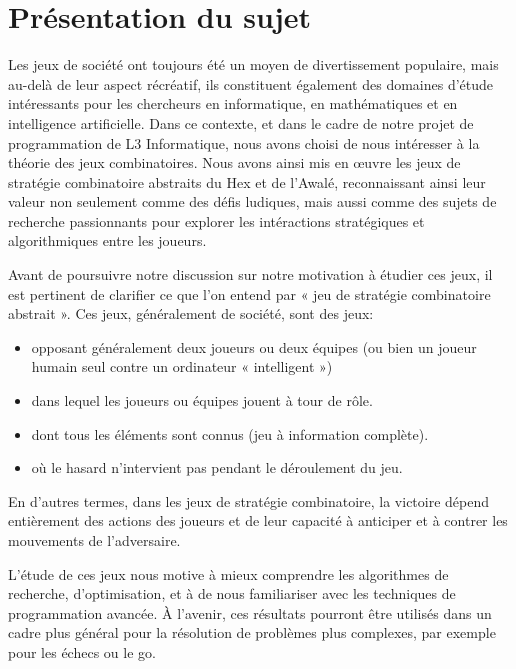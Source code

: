 \section{Présentation du sujet}
Les jeux de société ont toujours été un moyen de divertissement populaire, mais au-delà 
de leur aspect récréatif, ils constituent également des domaines d'étude intéressants pour les 
chercheurs en informatique, en mathématiques et en intelligence artificielle. 
Dans ce contexte, et dans le cadre de notre projet de programmation de L3 Informatique, 
nous avons choisi de nous intéresser à la théorie des jeux combinatoires. Nous avons ainsi mis 
en œuvre les jeux de stratégie combinatoire abstraits du Hex et de l'Awalé, reconnaissant ainsi 
leur valeur non seulement comme des défis ludiques, mais aussi comme des sujets de recherche 
passionnants pour explorer les intéractions stratégiques et algorithmiques entre les joueurs.

Avant de poursuivre notre discussion sur notre motivation à étudier ces jeux, il est pertinent
de clarifier ce que l'on entend par « jeu de stratégie combinatoire abstrait ». Ces jeux, généralement de société, sont des jeux:
\begin{itemize}
	\item opposant généralement deux joueurs ou deux équipes (ou bien un joueur humain seul 
	contre un ordinateur « intelligent »)
	\item dans lequel les joueurs ou équipes jouent à tour de rôle.
	\item dont tous les éléments sont connus (jeu à information complète).
	\item où le hasard n'intervient pas pendant le déroulement du jeu.
\end{itemize}
En d'autres termes, dans les jeux de stratégie combinatoire, la victoire dépend entièrement 
des actions des joueurs et de leur capacité à anticiper et à contrer les mouvements de l'adversaire. 


L'étude de ces jeux nous motive à mieux comprendre les algorithmes de 
recherche, d'optimisation, et à de nous familiariser avec les techniques de 
programmation avancée. À l'avenir, ces résultats pourront être utilisés dans
un cadre plus général pour la résolution de problèmes plus complexes, par exemple
pour les échecs ou le go. 



